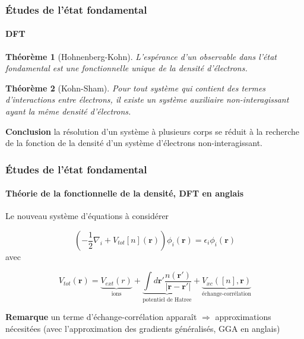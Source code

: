 \documentclass[a4paper, 12pt, twoside, titlepage, french]{beamer}
\newtheorem{theoreme}{Théorème}
\begin{document}
\begin{frame}
\frametitle{Études de l'état fondamental}
\framesubtitle{DFT}
\begin{theoreme}[Hohnenberg-Kohn]
  L'espérance d'un observable dans l'état fondamental est une fonctionnelle unique
  de la densité d'électrons.
\end{theoreme}

\begin{theoreme}[Kohn-Sham]
  Pour tout système qui contient des termes d'interactions entre électrons,
  il existe un système auxiliaire non-interagissant ayant la même densité d'électrons.
\end{theoreme}

\textbf{Conclusion} la résolution d'un système à plusieurs corps se réduit à la recherche de la fonction de la densité d'un système d'électrons non-interagissant.
\end{frame}
\newpage
\begin{frame}
\frametitle{Études de l'état fondamental}
\framesubtitle{Théorie de la fonctionnelle de la densité, DFT en anglais}
Le nouveau système d'équations à considérer

\begin{equation}
  (-\frac{1}{2}\nabla_i + V_{tot}[n](\textbf{r}))\phi_i(\textbf{r}) = \epsilon_i\phi_i(\textbf{r})
\end{equation}
avec

\begin{equation}
  V_{tot}(\textbf{r}) = \underbrace{V_{ext}(r)}_\text{ions}
  + \underbrace{\int d \textbf{r}' \frac{n(\textbf{r}')}{|\textbf{r} - \textbf{r}'|}}_\text{potentiel de Hatree}
  + \underbrace{V_{xc}([n], \textbf{r})}_\text{échange-corrélation}
\end{equation}

\textbf{Remarque} un terme d'échange-corrélation apparaît $\Longrightarrow$ approximations nécesitées (avec l'approximation des gradients généralisés, GGA en anglais)
\end{frame}
\newpage
\end{document}
